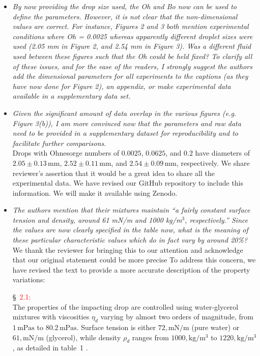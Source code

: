 \documentclass[]{article}
\newcommand*\red{\textcolor{red}}
\newcommand{\oo}{\color{magenta} \normalfont}
\newcommand{\bb}{\color{black} \normalfont}
\begin{document}
\begin{enumerate}
\begin{itemize}
		
		\item \textit{By now providing the drop size used, the Oh and Bo now can be used to define the parameters. However, it is not clear that the non-dimensional values are correct. For instance, Figures 2 and 3 both mention experimental conditions where Oh = 0.0025 whereas apparently different droplet sizes were used (2.05 mm in Figure 2, and 2.54 mm in Figure 3). Was a different fluid used between these figures such that the Oh could be held fixed? To clarify all of these issues, and for the ease of the readers, I strongly suggest the authors add the dimensional parameters for all experiments to the captions (as they have now done for Figure 2), an appendix, or make experimental data available in a supplementary data set.}	
		
		\item \textit{Given the significant amount of data overlap in the various figures (e.g. Figure 3(b)), I am more convinced now that the parameters and raw data need to be provided in a supplementary dataset for reproducibility and to facilitate further comparisons.}\\[2mm]
		
		Drops with Ohnesorge numbers of $0.0025$, $0.0625$, and $0.2$ have diameters of $2.05 \pm 0.13\,\si{\milli\meter}$, $2.52 \pm 0.11\,\si{\milli\meter}$, and $2.54 \pm 0.09\,\si{\milli\meter}$, respectively. We share reviewer's assertion that it would be a great idea to share all the experimental data. We have revised our GitHub repository to include this information. We will make it available using Zenodo. 
		
		
		\item \textit{The authors mention that their mixtures maintain ``a fairly constant surface tension and density, around 61 mN/m and 1000 kg/m$^3$, respectively.'' Since the values are now clearly specified in the table now, what is the meaning of these particular characteristic values which do in fact vary by around 20\%?}\\[2mm]
		
		We thank the reviewer for bringing this to our attention and acknowledge that our original statement could be more precise
		To address this concern, we have revised the text to provide a more accurate description of the property variations:
				
		\S~\red{2.1:}\\
		\oo
		The properties of the impacting drop are controlled using water-glycerol mixtures with viscosities $\eta_d$ varying by almost two orders of magnitude, from $1\,\si{\milli\pascal}\si{\second}$ to $80.2\,\si{\milli\pascal}\si{\second}$. Surface tension is either $72,\si{\milli\newton}/\si{\meter}$ (pure water) or $61,\si{\milli\newton}/\si{\meter}$ (glycerol), while density $\rho_d$ ranges from $1000,\si{\kilo\gram}/\si{\cubic\meter}$ to $1220,\si{\kilo\gram}/\si{\cubic\meter}$, as detailed in table~1 \citep{cheng2008formula, volk2018density, Jha2020}.
		\bb
	\end{itemize}
	

\end{enumerate}
\end{document}
